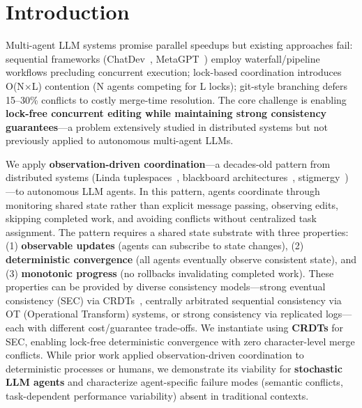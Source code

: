 \documentclass{article}
\begin{document}

\section{Introduction}
\label{sec:introduction}

Multi-agent LLM systems promise parallel speedups but existing approaches fail: sequential frameworks (ChatDev~\cite{chen2024chatdev}, MetaGPT~\cite{hong2023metagpt}) employ waterfall/pipeline workflows precluding concurrent execution; lock-based coordination introduces O(N$\times$L) contention (N agents competing for L locks); git-style branching defers 15--30\% conflicts to costly merge-time resolution. The core challenge is enabling \textbf{lock-free concurrent editing while maintaining strong consistency guarantees}---a problem extensively studied in distributed systems but not previously applied to autonomous multi-agent LLMs.

We apply \textbf{observation-driven coordination}---a decades-old pattern from distributed systems (Linda tuplespaces~\cite{gelernter1985linda}, blackboard architectures~\cite{erman1980hearsay}, stigmergy~\cite{theraulaz1999stigmergy})---to autonomous LLM agents. In this pattern, agents coordinate through monitoring shared state rather than explicit message passing, observing edits, skipping completed work, and avoiding conflicts without centralized task assignment. The pattern requires a shared state substrate with three properties: (1) \textbf{observable updates} (agents can subscribe to state changes), (2) \textbf{deterministic convergence} (all agents eventually observe consistent state), and (3) \textbf{monotonic progress} (no rollbacks invalidating completed work). These properties can be provided by diverse consistency models---strong eventual consistency (SEC) via CRDTs~\cite{shapiro2011crdts}, centrally arbitrated sequential consistency via OT (Operational Transform) systems, or strong consistency via replicated logs---each with different cost/guarantee trade-offs. We instantiate using \textbf{CRDTs} for SEC, enabling lock-free deterministic convergence with zero character-level merge conflicts. While prior work applied observation-driven coordination to deterministic processes or humans, we demonstrate its viability for \textbf{stochastic LLM agents} and characterize agent-specific failure modes (semantic conflicts, task-dependent performance variability) absent in traditional contexts.
\end{document}
